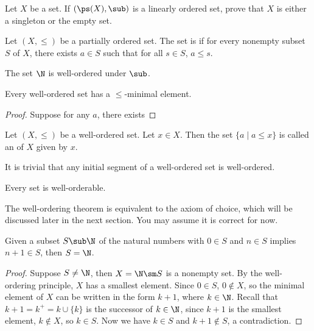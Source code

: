 \documentclass[10pt]{article}
\begin{document}
\begin{problem}
    Let $X$ be a set. If $(\ps(X),\sub)$ is a linearly ordered set, prove that $X$ is either a singleton or the empty set.
\end{problem}
\begin{definition}
    Let $(X,\le)$ be a partially ordered set. The set is  if for every nonempty subset $S$ of $X$, there exists $a\in S$ such that for all $s\in S$, $a\le s$.
\end{definition}
\begin{proposition}
    The set $\N$ is well-ordered under $\sub$.
\end{proposition}

\begin{proposition}
    Every well-ordered set has a $\le$-minimal element.
\end{proposition}
\begin{proof}
    Suppose for any $a$, there exists 
\end{proof}
\begin{definition}
    Let $(X,\le)$ be a well-ordered set. Let $x\in X$. Then the set $\{a\mid a\le x\}$ is called an  of $X$ given by $x$.
\end{definition}
\par
It is trivial that any initial segment of a well-ordered set is well-ordered.
\begin{theorem}
    Every set is well-orderable.
\end{theorem}
\par
The well-ordering theorem is equivalent to the axiom of choice, which will be discussed later in the next section. You may assume it is correct for now. 
\begin{theorem}
    Given a subset $S\sub\N$ of the natural numbers with $0\in S$ and $n\in S$ implies $n+1\in S$, then $S=\N$.
\end{theorem}
\begin{proof}
    Suppose $S\ne\N$, then $X=\N\sm S$ is a nonempty set. By the well-ordering principle, $X$ has a smallest element. Since $0\in S$, $0\notin X$, so the minimal element of $X$ can be written in the form $k+1$, where $k\in\N$. Recall that $k+1={k}^{+}=k\cup\{k\}$ is the successor of $k\in\N$, since $k+1$ is the smallest element, $k\notin X$, so $k\in S$. Now we have $k\in S$ and $k+1\notin S$, a contradiction.
\end{proof}
\end{document}
